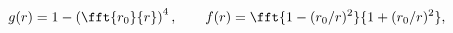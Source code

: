 \begin{equation}
g(r)=1-\left(\fft{r_0}{r}\right)^4,\qquad
f(r)=\fft{1-(r_0/r)^2}{1+(r_0/r)^2},
\label{eq:fgeqn}
\end{equation}

